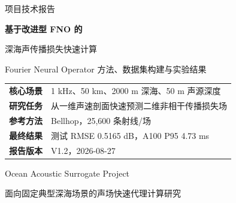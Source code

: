 \documentclass[UTF8,11pt]{ctexart}
\begin{document}
\begin{titlepage}

\vspace*{2.0cm}
{\sffamily\color{Blue}\Large 项目技术报告}\par
\vspace{0.8cm}
{\sffamily\bfseries\color{Navy}\fontsize{27}{35}\selectfont
基于改进型 FNO 的\par
深海声传播损失快速计算}\par
\vspace{0.7cm}
{\sffamily\color{Dark}\Large
Fourier Neural Operator 方法、数据集构建与实验结果}\par

\vspace{1.6cm}
\begin{summarybox}
\centering
\begin{tabular}{L{3.4cm}L{7.8cm}}
\textbf{核心场景} & 1 kHz、50 km、2000 m 深海、50 m 声源深度 \\
\textbf{研究任务} & 从一维声速剖面快速预测二维非相干传播损失场 \\
\textbf{参考方法} & Bellhop，25,600 条射线/场 \\
\textbf{最终结果} & 测试 RMSE 0.5165 dB，A100 P95 4.73 ms \\
\textbf{报告版本} & V1.2，2026-08-27 \\
\end{tabular}
\end{summarybox}

\vfill
{\sffamily\color{Navy}\Large Ocean Acoustic Surrogate Project}\par
\vspace{0.3cm}
{\color{Dark}面向固定典型深海场景的声场快速代理计算研究}\par
\vspace{1.1cm}
\end{titlepage}


\end{document}
